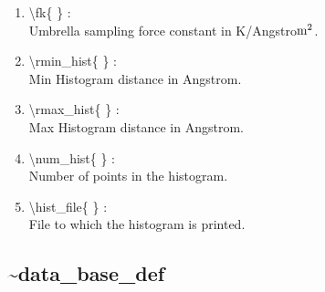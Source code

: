 \documentclass[12pt,titlepage]{article}
\begin{document}
\begin{enumerate}
 \vspace{0.15in} 
 \item  \textbackslash fk\{ \} : \\               
    Umbrella sampling force constant in K/Angstro${\rm m}^2$.

 \vspace{0.15in} 
 \item  \textbackslash rmin\_hist\{ \} : \\         
    Min Histogram distance in Angstrom.

 \vspace{0.15in} 
 \item  \textbackslash rmax\_hist\{ \} : \\         
    Max Histogram distance in Angstrom.

 \vspace{0.15in} 
 \item  \textbackslash num\_hist\{ \} : \\         
    Number of points in the histogram.
 
 \vspace{0.15in} 
 \item  \textbackslash hist\_file\{ \} : \\        
    File to which the histogram is printed.

\end{enumerate}

\newpage
\subsection*{\bf \~{}data\_base\_def}
\end{document}
